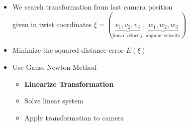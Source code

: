 \documentclass{beamer}
\begin{document}
{\begin{columns}
\begin{figure}
                        \end{figure}
                        \begin{itemize}
                            \item We search transformation from last camera position\\
                            given in twist coordinates $\xi = (\underbrace{v_1, v_2, v_3}_{\text{linear velocity}}, \underbrace{w_1, w_2, w_3}_{\text{angular velocity}})$
                            \item Minimize the squared distance error $E(\xi)$
                            \item Use Gauss-Newton Method
                            \begin{itemize}
                                  \item {\textbf{Linearize Transformation}}
                                  \item Solve linear system
                                  \item Apply transformation to camera
                            \end{itemize}
                \end{itemize}
        \end{columns}
}
\end{document}
